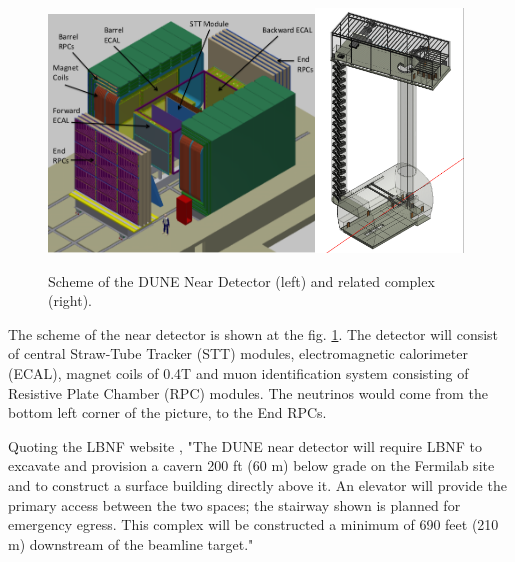 \begin{figure}
\caption{Scheme of the DUNE Near Detector (left) and related complex (right).}
\label{fig:nearDetector}
\centering
\includegraphics[width=0.63\textwidth, keepaspectratio=true]{figs/nearDetector.png}\includegraphics[width=0.35\textwidth, keepaspectratio=true]{figs/nearDetector_project.png}
\end{figure}

The scheme of the near detector is shown at the fig. \ref{fig:nearDetector}. The detector will consist of central Straw-Tube Tracker (STT) modules, electromagnetic calorimeter (ECAL), magnet coils of 0.4T and muon identification system consisting of Resistive Plate Chamber (RPC) modules. The neutrinos would come from the bottom left corner of the picture, to the End RPCs.

Quoting the LBNF website \cite{ref_LBNFweb}, "The DUNE near detector will require LBNF to excavate and provision a cavern 200 ft (60 m) below grade on the Fermilab site and to construct a surface building directly above it. An elevator will provide the primary access between the two spaces; the stairway shown is planned for emergency egress. This complex will be constructed a minimum of 690 feet (210 m) downstream of the beamline target."

